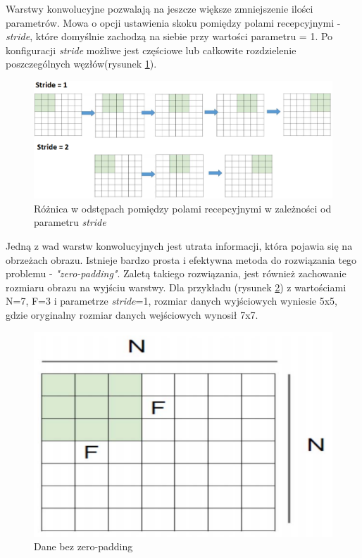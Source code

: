 \documentclass[a4paper,12pt,oneside]{book} %
\begin{document}
Warstwy konwolucyjne pozwalają na jeszcze większe zmniejszenie ilości parametrów. Mowa o opcji ustawienia skoku pomiędzy polami recepcyjnymi - \emph{stride}, które domyślnie zachodzą na siebie przy wartości parametru = 1. Po konfiguracji \emph{stride} możliwe jest częściowe lub całkowite rozdzielenie poszczególnych węzłów(rysunek \ref{stride_img})\cite{8308186}.

\begin{figure}[h]
	\centering
	\includegraphics[scale=0.6]{stride.png}
	\caption{Różnica w odstępach pomiędzy polami recepcyjnymi w zależności od parametru \emph{stride}\cite{8308186}}
	\label{stride_img}
\end{figure}

Jedną z wad warstw konwolucyjnych jest utrata informacji, która pojawia się na obrzeżach obrazu. Istnieje bardzo prosta i efektywna metoda do rozwiązania tego problemu - \textit{"zero-padding"}. Zaletą takiego rozwiązania, jest również zachowanie rozmiaru obrazu na wyjściu warstwy. Dla przykładu (rysunek \ref{no_padding}) z wartościami N=7, F=3 i parametrze \emph{stride}=1, rozmiar danych wyjściowych wyniesie 5x5, gdzie oryginalny rozmiar danych wejściowych wynosił 7x7\cite{8308186}.

\begin{figure}[h]
	\centering
	\includegraphics[scale=0.45]{no_padding.png}
	\caption{Dane bez zero-padding\cite{8308186}}
	\label{no_padding}
\end{figure}
\end{document}
